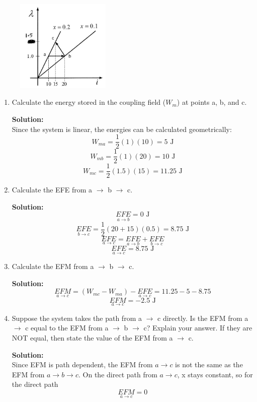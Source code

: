 \documentclass{article}
\begin{document}
\begin{figure}[H]
        \centering
        \includegraphics[width=0.4\textwidth]{figures/q6.PNG}
        \label{poletradsaj}
\end{figure}
\begin{enumerate}[label=(\alph*)]
    \item {Calculate the energy stored in the coupling field ($W_m$) at points a, b, and c.}
    
\textbf{Solution:} \\
Since the system is linear, the energies can be calculated geometrically:
$$W_{ma} = \frac{1}{2}(1)(10) = 5\text{ J}$$
$$W_{mb} = \frac{1}{2}(1)(20) = 10\text{ J}$$
$$W_{mc} = \frac{1}{2}(1.5)(15) = 11.25\text{ J}$$
    \item {Calculate the EFE from a $\rightarrow$ b $\rightarrow$ c.}

\textbf{Solution:}\\
$$\underset{a \to b}{EFE} = 0\text{ J}$$
$$\underset{b \to c}{EFE} = \frac{1}{2}(20 + 15)(0.5) = 8.75\text{ J}$$
$$\underset{a \to c}{EFE} = \underset{a \to b}{EFE} + \underset{b \to c}{EFE}$$
$$\boxed{\underset{a \to c}{EFE} = 8.75\text{ J}}$$
    \item {Calculate the EFM from a $\rightarrow$ b $\rightarrow$ c.}

\textbf{Solution:} \\
$$\underset{a \to c}{EFM} = (W_{mc} - W_{ma}) - \underset{a \to c}{EFE} = 11.25 - 5 - 8.75$$
$$\boxed{\underset{a \to c}{EFM} = -2.5\text{ J}}$$
    \item{Suppose the system takes the path from a $\rightarrow$ c directly. Is the EFM from a $\rightarrow$ c equal to the EFM from a $\rightarrow$ b $\rightarrow$ c? Explain your answer. If they are NOT equal, then state the value of the EFM from a $\rightarrow$ c.}

\textbf{Solution:} \\
Since EFM is path dependent, the EFM from $a \to c$ is not the same as the EFM from $a \to b \to c$.  On the direct path from $a \to c$, x stays constant, so for the direct path
$$\boxed{\underset{a \to c}{EFM} = 0}$$
\end{enumerate}
\newpage %
\noindent 
\end{document}
